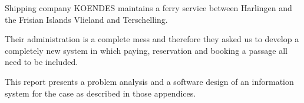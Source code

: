 Shipping company KOENDES maintains a ferry service between Harlingen and the Frisian Islands
Vlieland and Terschelling.

Their administration is a complete mess and therefore they asked us to develop a completely new
system in which paying, reservation and booking a passage all need to be included.

This report presents a problem analysis and a software design of an information system for the case as described in those appendices.